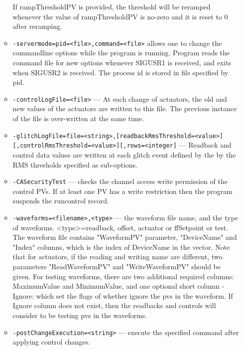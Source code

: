 \begin{itemize}
\begin{itemize}
               If rampThresholdPV is provided, the threshold will be reramped whenever 
               the value of rampThresholdPV is no-zero and it is reset to 0 after reramping.
        \item {\tt -servermode=pid=<file>,command=<file>}     allows one to change the commandline options while the program is
               running. Program reads the command file for new options whenever
               SIGUSR1 is received, and exits when SIGUSR2 is received.
               The process id is stored in file specified by pid.
        \item {\tt -controlLogFile=<file>} --- At each change of actuators, the old and new values of the actuators
               are written to this file. The previous instance of the file 
               is over-written at the same time.
        \item {\tt -glitchLogFile=file=<string>,[readbackRmsThreshold=<value>][,controlRmsThreshold=<value>][,rows=<integer]} ---
                  Readback and control data values
               are written at each glitch event defined by the
               by the RMS thresholds specified as sub-options.
        \item {\tt -CASecurityTest} --- checks the channel access write permission of the control PVs.
               If at least one PV has a write restriction then the program suspends
               the runcontrol record.
        \item {\tt -waveforms=<filename>,<type>} --- the waveform file name, and the type of
               waveforms. <type>=readback, offset, actuator or ffSetpoint or test.
               The waveform file contains "WaveformPV" parameter,
               "DeviceName" and "Index" columns, which is the index of DeviceName in
               the vector. Note that for actuators, if the reading and writing name are
               different, two parameters "ReadWaveformPV" and "WriteWaveformPV"
               should be given. For testing waveforms, there are two additional required columns:
               MaximumValue and MinimumValue, and one optional short column - Ignore:
               which set the flags of whether ignore the pvs in the waveform. If Ignore column
               does not exist, then the readbacks and controls will consider to be testing pvs
               in the waveforms.
        \item {\tt -postChangeExecution=<string>} --- execute the specified command after applying control changes.
    \end{itemize}


\end{itemize}
